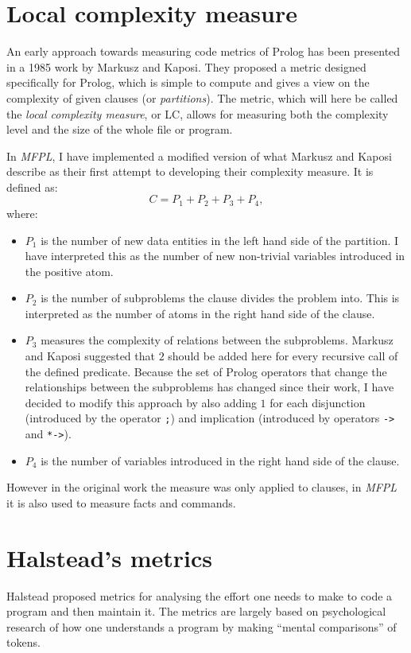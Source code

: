 \documentclass[11pt,a4paper,twoside]{article}
\begin{document}
\begin{multicols}{2}
\section{Local complexity measure}

An early approach towards measuring code metrics of Prolog has been
presented in a 1985 work by Markusz and Kaposi\cite{markusz}. They
proposed a metric designed specifically for Prolog, which is simple to
compute and gives a view on the complexity of given clauses (or
\emph{partitions}). The metric, which will here be called the
\emph{local complexity measure}, or LC, allows for measuring both the
complexity level and the size of the whole file or program.

In \emph{MFPL}, I have implemented a modified version of what Markusz
and Kaposi describe as their first attempt to developing their
complexity measure.  It is defined as:
$$ C = P_1 + P_2 + P_3 + P_4, $$
where:
\begin{itemize}
\item $P_1$ is the number of new data entities in the left hand side
  of the partition. I have interpreted this as the number of new
  non-trivial variables introduced in the positive atom.
\item $P_2$ is the number of subproblems the clause divides the
  problem into. This is interpreted as the number of atoms in the
  right hand side of the clause.
\item $P_3$ measures the complexity of relations between the
  subproblems. Markusz and Kaposi suggested that $2$ should be added
  here for every recursive call of the defined predicate. Because the
  set of Prolog operators that change the relationships between the
  subproblems has changed since their work, I have decided to modify
  this approach by also adding $1$ for each disjunction (introduced by
  the operator \texttt{;}) and implication (introduced by operators
  \texttt{->} and \texttt{*->}).
\item $P_4$ is the number of variables introduced in the right hand
  side of the clause.
\end{itemize}
However in the original work the measure was only applied to clauses, 
in \emph{MFPL} it is also used to measure facts and commands. 

\section{Halstead's metrics}

Halstead\cite{halstead} proposed metrics for analysing the effort one
needs to make to code a program and then maintain it. The metrics are
largely based on psychological research of how one understands a
program by making ``mental comparisons'' of tokens.


\end{multicols}
\end{document}
